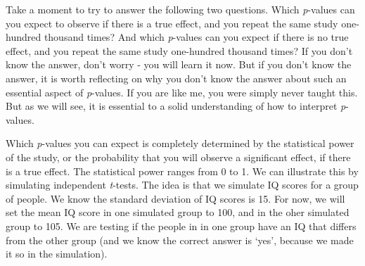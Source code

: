 \documentclass[
  oneside]{krantz}
\makeatletter
\newenvironment{Shaded}{\begin{snugshade}}{\end{snugshade}}
\newcommand{\AttributeTok}[1]{\textcolor[rgb]{0.61,0.61,0.61}{#1}}
\newcommand{\CommentTok}[1]{\textcolor[rgb]{0.37,0.37,0.37}{\textit{#1}}}
\newcommand{\ControlFlowTok}[1]{\textcolor[rgb]{0.27,0.27,0.27}{\textbf{#1}}}
\newcommand{\DecValTok}[1]{\textcolor[rgb]{0.06,0.06,0.06}{#1}}
\newcommand{\FloatTok}[1]{\textcolor[rgb]{0.06,0.06,0.06}{#1}}
\newcommand{\FunctionTok}[1]{\textcolor[rgb]{0,0,0}{#1}}
\newcommand{\NormalTok}[1]{#1}
\newcommand{\OtherTok}[1]{\textcolor[rgb]{0.37,0.37,0.37}{#1}}
\newcommand{\SpecialCharTok}[1]{\textcolor[rgb]{0,0,0}{#1}}
\newenvironment{kframe}{%
\medskip{}
\setlength{\fboxsep}{.8em}
 \def\at@end@of@kframe{}%
 \ifinner\ifhmode%
  \def\at@end@of@kframe{\end{minipage}}%
  \begin{minipage}{\columnwidth}%
 \fi\fi%
 \def\FrameCommand##1{\hskip\@totalleftmargin \hskip-\fboxsep
 \colorbox{shadecolor}{##1}\hskip-\fboxsep
     \hskip-\linewidth \hskip-\@totalleftmargin \hskip\columnwidth}%
 \MakeFramed {\advance\hsize-\width
   \@totalleftmargin\z@ \linewidth\hsize
   \@setminipage}}%
 {\par\unskip\endMakeFramed%
 \at@end@of@kframe}
\renewenvironment{Shaded}{\begin{kframe}}{\end{kframe}}
\makeatother
\begin{document}
Take a moment to try to answer the following two questions. Which \emph{p}-values can you expect to observe if there is a true effect, and you repeat the same study one-hundred thousand times? And which \emph{p}-values can you expect if there is no true effect, and you repeat the same study one-hundred thousand times? If you don't know the answer, don't worry - you will learn it now. But if you don't know the answer, it is worth reflecting on why you don't know the answer about such an essential aspect of \emph{p}-values. If you are like me, you were simply never taught this. But as we will see, it is essential to a solid understanding of how to interpret \emph{p}-values.

Which \emph{p}-values you can expect is completely determined by the statistical power of the study, or the probability that you will observe a significant effect, if there is a true effect. The statistical power ranges from 0 to 1. We can illustrate this by simulating independent \emph{t}-tests. The idea is that we simulate IQ scores for a group of people. We know the standard deviation of IQ scores is 15. For now, we will set the mean IQ score in one simulated group to 100, and in the oher simulated group to 105. We are testing if the people in in one group have an IQ that differs from the other group (and we know the correct answer is `yes', because we made it so in the simulation).

\begin{Shaded}
\end{Shaded}
\end{document}
